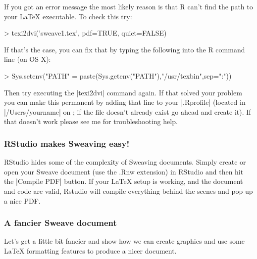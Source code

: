 If you got an error message the most likely reason is that R can't find
the path to your LaTeX executable. To check this try:
%
\begin{R}
> texi2dvi('sweave1.tex', pdf=TRUE, quiet=FALSE)
\end{R}
%
If that's the case, you can fix that by typing the following into the R
command line (on OS X):
%
\begin{R}
> Sys.setenv("PATH" = paste(Sys.getenv("PATH"),"/usr/texbin",sep=":"))  
\end{R}
%
Then try executing the |texi2dvi| command again. If that
solved your problem you can make this permanent by adding that line to
your |.Rprofile| (located in |/Users/yourname| on \OSX; if the
file doesn't already exist go ahead and create it). If that doesn't work
please see me for troubleshooting help.

\subsubsection{RStudio makes Sweaving easy!}

RStudio hides some of the complexity of Sweaving documents. Simply
create or open your Sweave document (use the .Rnw extension) in RStudio
and then hit the |Compile PDF| button. If your LaTeX setup is
working, and the document and code are valid, Rstudio will compile
everything behind the scenes and pop up a nice PDF.

\subsubsection{A fancier Sweave document}

Let's get a little bit fancier and show how we can create graphics and
use some LaTeX formatting features to produce a nicer document.


